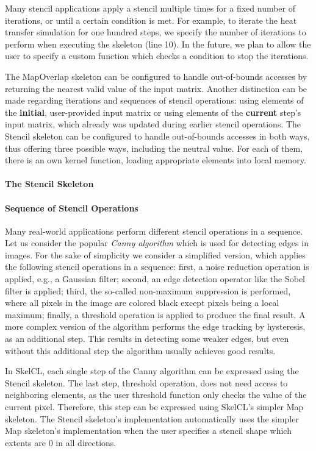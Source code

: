 Many stencil applications apply a stencil multiple times for a fixed number of iterations, or until a certain condition is met.
For example, to iterate the heat transfer simulation for one hundred steps, we specify the number of iterations to perform when executing the skeleton (line 10).
In the future, we plan to allow the user to specify a custom function which checks a condition to stop the iterations.

The MapOverlap skeleton can be configured to handle out-of-bounds accesses by returning the nearest valid value of the input matrix.
Another distinction can be made regarding iterations and sequences of stencil operations:
using elements of the \textbf{initial}, user-provided input matrix or using elements of the \textbf{current} step's input matrix, which already was updated during earlier stencil operations.
The Stencil skeleton can be configured to handle out-of-bounds accesses in both ways, thus offering three possible ways, including the neutral value. 
For each of them, there is an own kernel function, loading appropriate elements into local memory. 

\paragraph{The Stencil Skeleton}

\paragraph{Sequence of Stencil Operations}
Many real-world applications perform different stencil operations in a sequence.
Let us consider the popular \emph{Canny algorithm} which is used for detecting edges in images.
For the sake of simplicity we consider a simplified version, which applies the following stencil operations in a sequence:
first, a noise reduction operation is applied, e.g., a Gaussian filter;
second, an edge detection operator like the Sobel filter is applied;
third, the so-called non-maximum suppression is performed, where all pixels in the image are colored black except pixels being a local maximum;
finally, a threshold operation is applied to produce the final result.
A more complex version of the algorithm performs the edge tracking by hysteresis, as an additional step.
This results in detecting some weaker edges, but even without this
additional step the algorithm usually achieves good results.

In SkelCL, each single step of the Canny algorithm can be expressed using the Stencil skeleton.
The last step, threshold operation, does not need access to neighboring elements, as the user threshold function only checks the value of the current pixel.
Therefore, this step can be expressed using SkelCL's simpler Map skeleton.
The Stencil skeleton's implementation automatically uses the simpler Map skeleton's implementation when the user specifies a stencil shape which extents are $0$ in all directions.

